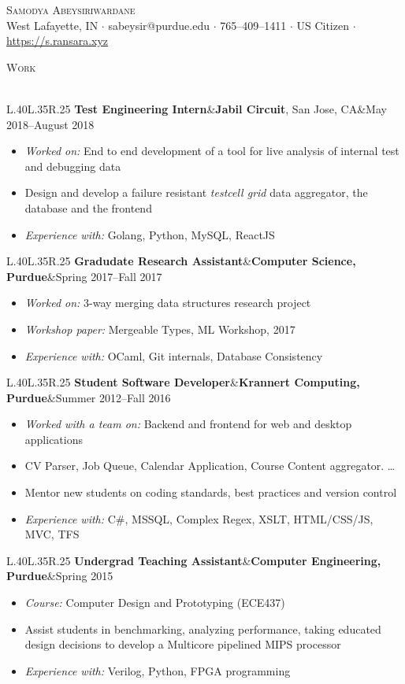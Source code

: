 \documentclass[a4paper]{article}
\newcommand{\header} [1] {
    {\hspace*{-18pt}\vspace*{6pt} \textsc{#1}
    \vspace*{-14pt} \\ \hspace*{-18pt} \hrulefill{} \\
    \vspace{1mm}}
}
\newcommand{\threeparts} [3] {
    {\setlength\tabcolsep{0pt}
    \begin{tabularx}{\linewidth}{L{.40\linewidth}L{.35\linewidth}R{.25\linewidth}} 
    \textbf{#1}&#2&#3
    \end{tabularx}}
}
\begin{document}
\begin{center}
	{\Huge \scshape {Samodya Abeysiriwardane}}\\
	West Lafayette, IN $\cdot$ sabeysir@purdue.edu $\cdot$ 765--409--1411 $\cdot$ US Citizen $\cdot$ \url{https://s.ransara.xyz}\\
\end{center}

\header{Work}
\threeparts{Test Engineering Intern}{\textbf{Jabil Circuit}, San Jose, CA}{May 2018--August 2018}
\begin{itemize}[label=$\square$]
	\item \textit{Worked on:} End to end development of a tool for live analysis of internal test and debugging data
    \item Design and develop a failure resistant \textit{testcell grid} data aggregator, the database and the frontend
    \item \textit{Experience with:} Golang, Python, MySQL, ReactJS
\end{itemize}
\threeparts{Gradudate Research Assistant}{\textbf{Computer Science, Purdue}}{Spring 2017--Fall 2017}
\begin{itemize}[label=$\square$]
    \item \textit{Worked on:} 3-way merging data structures research project
    \item \textit{Workshop paper:} Mergeable Types, ML Workshop, 2017
	\item \textit{Experience with:} OCaml, Git internals, Database Consistency
\end{itemize}
\threeparts{Student Software Developer}{\textbf{Krannert Computing, Purdue}}{Summer 2012--Fall 2016}
\begin{itemize}[label=$\square$]
    \item \textit{Worked with a team on:} Backend and frontend for web and desktop applications
    \item CV Parser, Job Queue, Calendar Application, Course Content aggregator. \dots
    \item Mentor new students on coding standards, best practices and version control
    \item \textit{Experience with:} C\#, MSSQL, Complex Regex, XSLT, HTML/CSS/JS, MVC, TFS
\end{itemize}
\threeparts{Undergrad Teaching Assistant}{\textbf{Computer Engineering, Purdue}}{Spring 2015}
\begin{itemize}[label=$\square$]
	\item \textit{Course:} Computer Design and Prototyping (ECE437)
    \item Assist students in benchmarking, analyzing performance, taking educated design decisions to develop a Multicore pipelined MIPS processor
    \item \textit{Experience with:} Verilog, Python, FPGA programming
\end{itemize}
\end{document}
